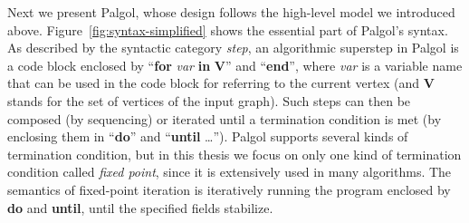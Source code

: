 \documentclass{sokendai_thesis} %
\begin{document}
Next we present Palgol, whose design follows the high-level model we introduced above.
Figure~\ref{fig:syntax-simplified} shows the essential part of Palgol's syntax.
As described by the syntactic category \textit{step}, an algorithmic superstep in Palgol is a code block
enclosed by ``\textbf{for} \textit{var} \textbf{in} \textbf{V}'' and ``\textbf{end}'', where \textit{var} is a variable name that can be used in the code block for referring to the current vertex (and \textbf{V} stands for the set of vertices of the input graph).
Such steps can then be composed (by sequencing) or iterated until a termination condition is met (by enclosing them in ``\textbf{do}'' and ``\textbf{until} \ldots'').
Palgol supports several kinds of termination condition, but in this thesis we focus on only one kind of termination condition called \textit{fixed point}, since it is extensively used in many algorithms.
The semantics of fixed-point iteration is iteratively running the program enclosed by \textbf{do} and \textbf{until}, until the specified fields stabilize.
\end{document}
